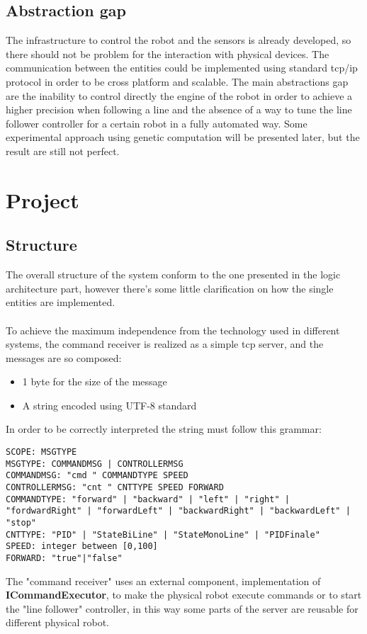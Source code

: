 \documentclass{llncs}
\newcommand{\labelsec}[1]{\label{sec:#1}}
\begin{document}
\subsection{Abstraction gap}
The infrastructure to control the robot and the sensors is already developed, so there should not be problem for the interaction with physical devices. The communication between the entities could be implemented using standard tcp/ip protocol in order to be cross platform and scalable. The main abstractions gap are the inability to control directly the engine of the robot in order to achieve a higher precision when following a line and the absence of a way to tune the line follower controller for a certain robot in a fully automated way. Some experimental approach using genetic computation will be presented later, but the result are still not perfect.    

\newpage
\section{Project}
\labelsec{Project}

\subsection{Structure}
The overall structure of the system conform to the one presented in the logic architecture part, however there's some little clarification on how the single entities are implemented.\\

\\
To achieve the maximum independence from the technology used in different systems, the command receiver is realized as a simple tcp server, and the messages are so composed:
\begin{itemize}
	\item 1 byte for the size of the message
	\item A string encoded using UTF-8 standard
\end{itemize} 
In order to be correctly interpreted the string must follow this grammar:
\lstset{language=Java}
\begin{lstlisting}
SCOPE: MSGTYPE
MSGTYPE: COMMANDMSG | CONTROLLERMSG
COMMANDMSG: "cmd " COMMANDTYPE SPEED
CONTROLLERMSG: "cnt " CNTTYPE SPEED FORWARD
COMMANDTYPE: "forward" | "backward" | "left" | "right" | "fordwardRight" | "forwardLeft" | "backwardRight" | "backwardLeft" | "stop"
CNTTYPE: "PID" | "StateBiLine" | "StateMonoLine" | "PIDFinale"
SPEED: integer between [0,100]
FORWARD: "true"|"false"
\end{lstlisting}
The "command receiver" uses an external component, implementation of \textbf{ICommandExecutor}, to make the physical robot execute commands or to start the "line follower" controller, in this way some parts of the server are reusable for different physical robot.\\
\end{document}
